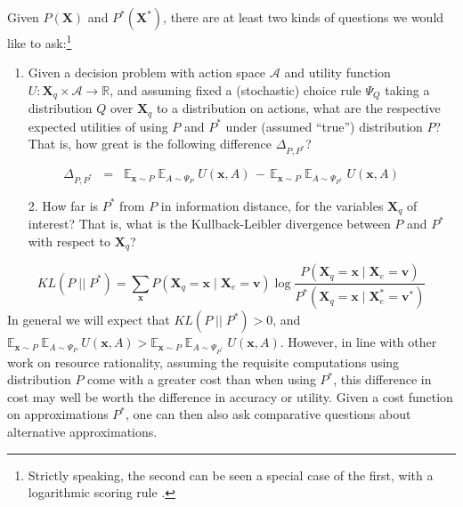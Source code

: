 \documentclass[10pt,letterpaper]{article}
\begin{document}
Given $P(\textbf{X})$ and $P^*(\textbf{X}^*)$, there are at least two kinds of questions we would like to ask:\footnote{Strictly speaking, the second can be seen a special case of the first, with a logarithmic scoring rule \citep{Bernardo}.} \begin{enumerate}
  \item Given a decision problem with action space $\mathcal{A}$ and utility function $U:\textbf{X}_q\times \mathcal{A} \rightarrow\mathbb{R}$, and assuming fixed a (stochastic) choice rule $\Psi_Q$ taking a distribution $Q$ over $\textbf{X}_q$ to a distribution on actions, what are the respective expected utilities of using $P$ and $P^*$ under (assumed ``true'') distribution $P$? That is, how great is the following difference $\Delta_{P,P^*}$? \end{enumerate}
  $$\Delta_{P,P^*} \;\; = \;\; \mathbb{E}_{\textbf{x}\sim P}\;\mathbb{E}_{A \sim \Psi_{P}}\;U(\textbf{x},A) \,-\, \mathbb{E}_{\textbf{x} \sim P}\;\mathbb{E}_{A \sim \Psi_{P^*}}\;U(\textbf{x},A)$$
  \begin{enumerate}
  \item[2.] How far is $P^*$ from $P$ in information distance, for the variables $\textbf{X}_q$ of interest? That is, what is the Kullback-Leibler divergence between $P$ and $P^*$ with respect to $\textbf{X}_q$?
\end{enumerate}$$KL(P \;||\; P^*)  =  \sum_{\textbf{x}} P(\textbf{X}_q = \textbf{x} \mid \textbf{X}_{e} = \textbf{v})\; \mbox{log} \; \frac{P(\textbf{X}_q = \textbf{x} \mid \textbf{X}_{e} = \textbf{v})}{P^*(\textbf{X}_q = \textbf{x} \mid \textbf{X}^*_{e} = \textbf{v}^*)}$$ In general we will expect that $KL(P \;||\; P^*) > 0$, and $\mathbb{E}_{\textbf{x}\sim P}\;\mathbb{E}_{A \sim \Psi_{P}}\;U(\textbf{x},A) > \mathbb{E}_{\textbf{x} \sim P}\;\mathbb{E}_{A \sim \Psi_{P^*}}\;U(\textbf{x},A)$. However, in line with other work on resource rationality, assuming the requisite computations using distribution $P$ come with a greater cost than when using $P^*$, this difference in cost may well be worth the difference in accuracy or utility. Given a cost function on approximations $P^*$, one can then also ask comparative questions about alternative approximations.


\end{document}
